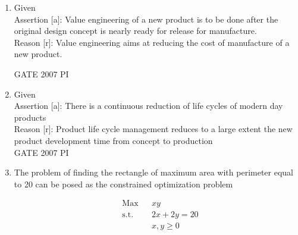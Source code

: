 \documentclass[journal,12pt,onecolumn]{IEEEtran}
\theoremstyle{remark}
\begin{document}
\begin{enumerate}
    \item  
    Given \\ 
{Assertion [a]}: Value engineering of a new product is to be done after the original 
design concept is nearly ready for release for manufacture. \\[4pt]
{Reason [r]}: Value engineering aims at reducing the cost of manufacture of a new product.

\hfill{GATE 2007 PI}
\begin{enumerate}
\end{enumerate}

\item  
Given \\ 
{Assertion [a]}: There is a continuous reduction of life cycles of modern day products \\
{Reason [r]}: Product life cycle management reduces to a large extent the new product development time from concept to production \\[4pt]

\hfill{GATE 2007 PI}

\begin{enumerate}
\end{enumerate}

\item 
The problem of finding the rectangle of maximum area with perimeter equal to 20 
can be posed as the constrained optimization problem

\[
\begin{aligned}
&\text{Max} && xy \\
&\text{s.t.} && 2x + 2y = 20 \\
& && x, y \geq 0
\end{aligned}
\]


\end{enumerate}
\end{document}
